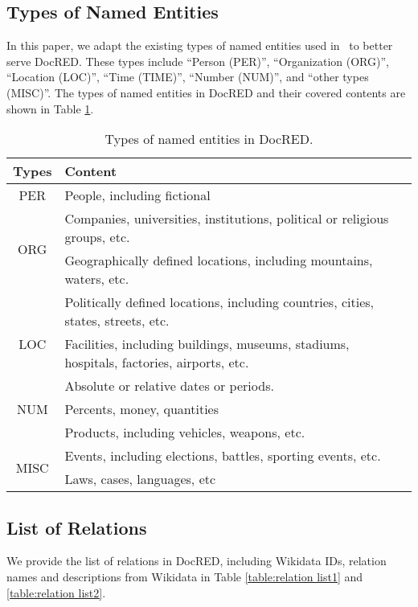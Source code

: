 \documentclass[11pt,a4paper]{article}
\begin{document}
\subsection{Types of Named Entities}

In this paper, we adapt the existing types of named entities used in~ to better serve DocRED. These types include ``Person (PER)'', ``Organization (ORG)'', ``Location (LOC)'', ``Time (TIME)'', ``Number (NUM)'', and ``other types (MISC)''. The types of named entities in DocRED and their covered contents are shown in Table \ref{table:entity types}. 

\begin{table}[thp!]
\centering
\small

\begin{tabular}{c | p{}}\toprule

Types & Content\\

\midrule

 PER  &  People, including fictional\\ 
 \hline
 \multirow{2}{*}{ORG}  &  Companies, universities, institutions, political or religious groups, etc. \\
  \hline

   & Geographically defined locations, including mountains, waters, etc. \\
 \multirow{3}{*}{LOC} & Politically defined locations, including countries, cities, states, streets, etc. \\
  & Facilities, including buildings, museums, stadiums, hospitals, factories, airports, etc.\\ 
  \hline
 TIME  &  Absolute or relative dates or periods.\\
 \hline
  NUM  &  Percents, money, quantities\\ 
    \hline

   &  Products, including vehicles, weapons, etc.\\
 \multirow{3}{*}{MISC} & Events, including elections, battles, sporting events, etc.\\
 & Laws, cases, languages, etc \\ 

\bottomrule
\end{tabular}
\caption{Types of named entities in DocRED.}
\label{table:entity types}
\end{table}

\subsection{List of Relations}
We provide the list of relations in DocRED, including Wikidata IDs, relation names and descriptions from Wikidata in Table  \ref{table:relation list1} and
\ref{table:relation list2}.
\end{document}
